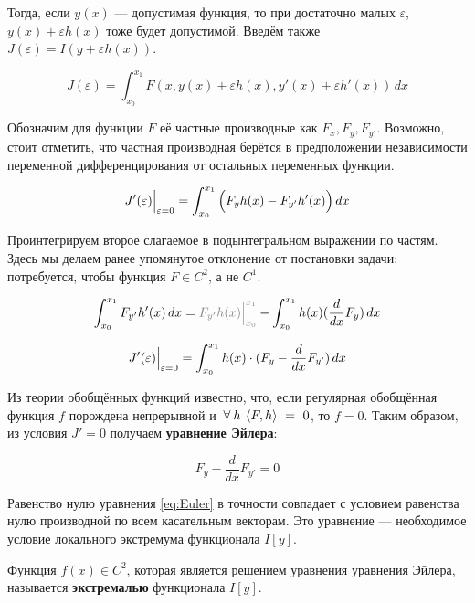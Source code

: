 \documentclass[12pt]{article}
\begin{document}
	Тогда, если $y(x)$ --- допустимая функция, то при достаточно малых $\varepsilon$, $y(x) + \varepsilon h(x)$ тоже
	будет допустимой. Введём также $J(\varepsilon) = I(y + \varepsilon h(x))$.
	
	$$J(\varepsilon) = \int_{x_0}^{x_1} F(x, y(x) + \varepsilon h(x), y'(x) + \varepsilon h'(x))\,dx$$

	Обозначим для функции $F$ её частные производные как $F_x, F_y, F_{y'}$. Возможно, стоит отметить, что частная производная
	берётся в предположении независимости переменной дифференцирования от остальных переменных функции.
	
	$$J'(\varepsilon)\Big|_{\varepsilon = 0}^{} = \int_{x_0}^{x_1} \Big( F_{y}h(x) - F_{y'}h'(x) \Big)\,dx$$
	
	Проинтегрируем второе слагаемое в подынтегральном выражении по частям. Здесь мы делаем ранее упомянутое отклонение
	от постановки задачи: потребуется, чтобы функция $F \in C^2$, а не $C^1$.
	
	$$\int_{x_0}^{x_1} F_{y'}h'(x) \,dx = \off{F_{y'}h(x) \lims{x_0}{x_1}} - \int_{x_0}^{x_1} h(x)(\frac{d}{dx} F_y)\,dx$$
	
	$$J'(\varepsilon)\Big|_{\varepsilon = 0}^{} = \int_{x_0}^{x_1}h(x)\cdot(F_y - \frac{d}{dx}F_{y'}) \,dx$$
	
	Из теории обобщённых функций известно, что, если регулярная обобщённая функция $f$ порождена непрерывной
	и $\forall h\:\scal{F}{h}~=~0$, то $f = 0$. Таким образом, из условия $J' = 0$ получаем \textbf{уравнение Эйлера}:
	
	\begin{equation} \label{eq:Euler}
			F_y - \frac{d}{dx}F_{y'} = 0 
	\end{equation}
	
	Равенство нулю уравнения \ref{eq:Euler} в точности совпадает с условием равенства нулю производной по всем 
	касательным векторам. Это уравнение --- необходимое условие локального экстремума функционала $I[y]$.
	
	\begin{defi}
			Функция $f(x) \in C^2$, которая является решением уравнения уравнения Эйлера, называется \textbf{экстремалью} 
			функционала $I[y]$.
	\end{defi}
	
\end{document}
